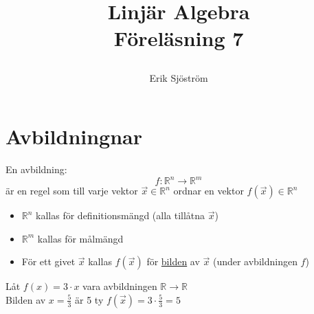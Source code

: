 
\title{
	 Linjär Algebra\\
	 Föreläsning 7
    \author{Erik Sjöström}
}

\maketitle

\section{Avbildningnar} %
\label{sec:avbildningnar}
En avbildning:
\[
f: \mathbb{R}^n \rightarrow \mathbb{R}^m
\]
är en regel som till varje vektor $\vec{x} \in \mathbb{R}^n$ ordnar en vektor $f(\vec{x}) \in \mathbb{R}^n$ 
\begin{itemize}
	\item $\mathbb{R}^n$ kallas för definitionsmängd (alla tillåtna $\vec{x}$)
	\item $\mathbb{R}^m$ kallas för målmängd
	\item För ett givet $\vec{x}$ kallas $f(\vec{x})$ för \underline{bilden} av $\vec{x}$ (under avbildningen $f$)
\end{itemize}
\begin{Ex}
    Låt $f(x) = 3 \cdot x$ vara avbildningen $\mathbb{R} \rightarrow \mathbb{R}$\\
    Bilden av $x = \frac{5}{3}$ är 5 ty $f(\vec{x}) = 3 \cdot \frac{5}{3} = 5$
\end{Ex}

